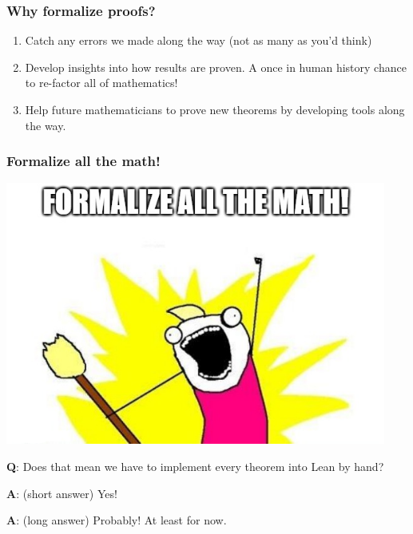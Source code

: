 \documentclass{beamer}
\begin{document}
\begin{frame}
    \frametitle{Why formalize proofs?}
    \begin{enumerate}
        \item<1-> Catch any errors we made along the way (not as many as you'd think)
        \item<2-> Develop insights into how results are proven. A once in human history chance to re-factor all of mathematics!
        \item<3-> Help future mathematicians to prove new theorems by developing tools along the way.
    \end{enumerate}
\end{frame}

\begin{frame}
    \frametitle{Formalize all the math!}
    \begin{center}
    \includegraphics[scale=.35]{img/formalize.png}
    \end{center}
    {\bf Q}: Does that mean we have to implement every theorem into Lean by hand?
    \pause

    {\bf A}: (short answer) Yes!

    \pause
    {\bf A}: (long answer) Probably! At least for now.
\end{frame}
\end{document}
